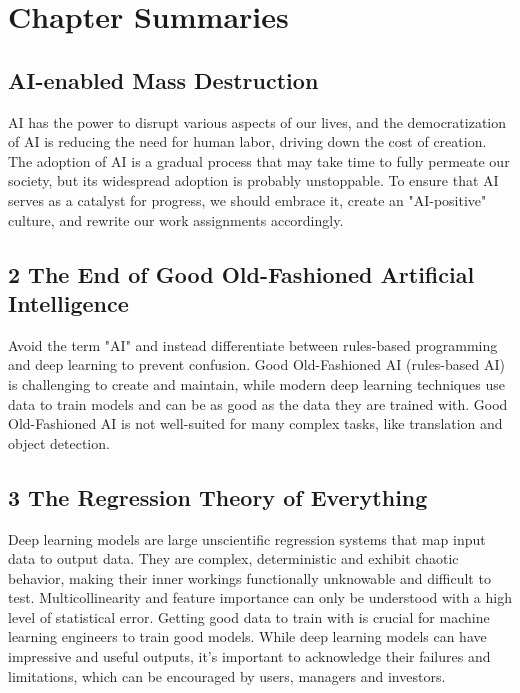 \chapter*{Chapter Summaries}

\section*{AI-enabled Mass Destruction}

AI has the power to disrupt various aspects of our lives, and the democratization of AI is reducing the need for human labor, driving down the cost of creation. The adoption of AI is a gradual process that may take time to fully permeate our society, but its widespread adoption is probably unstoppable. To ensure that AI serves as a catalyst for progress, we should embrace it, create an "AI-positive" culture, and rewrite our work assignments accordingly.

\section*{2 The End of Good Old-Fashioned Artificial Intelligence}

Avoid the term "AI" and instead differentiate between rules-based programming and deep learning to prevent confusion. Good Old-Fashioned AI (rules-based AI) is challenging to create and maintain, while modern deep learning techniques use data to train models and can be as good as the data they are trained with. Good Old-Fashioned AI is not well-suited for many complex tasks, like translation and object detection.

\section*{3 The Regression Theory of Everything}

Deep learning models are large unscientific regression systems that map input data to output data. They are complex, deterministic and exhibit chaotic behavior, making their inner workings functionally unknowable and difficult to test. Multicollinearity and feature importance can only be understood with a high level of statistical error. Getting good data to train with is crucial for machine learning engineers to train good models. While deep learning models can have impressive and useful outputs, it's important to acknowledge their failures and limitations, which can be encouraged by users, managers and investors.

